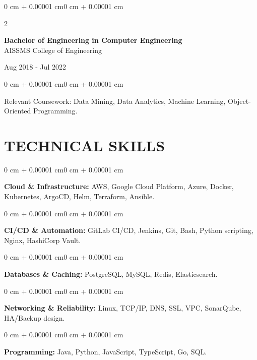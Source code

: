 \documentclass[10pt, letterpaper]{article}
\newenvironment{onecolentry}{
    \begin{adjustwidth}{0 cm + 0.00001 cm}{0 cm + 0.00001 cm}
}{
    \end{adjustwidth}
}
\newenvironment{twocolentry}[2][]{
    \onecolentry
    \def\secondColumn{#2}
    \setcolumnwidth{\fill, 4.5 cm}
    \begin{paracol}{2}
}{
    \switchcolumn \raggedleft \secondColumn
    \end{paracol}
    \endonecolentry
}
\begin{document}
\begin{twocolentry}{
    Aug 2018 - Jul 2022
}
    \textbf{Bachelor of Engineering in Computer Engineering} \\
    AISSMS College of Engineering
\end{twocolentry}
\begin{onecolentry}
Relevant Coursework: Data Mining, Data Analytics, Machine Learning, Object-Oriented Programming.
\end{onecolentry}
\section{TECHNICAL SKILLS}
\begin{onecolentry}
\textbf{Cloud \& Infrastructure:} AWS, Google Cloud Platform, Azure, Docker, Kubernetes, ArgoCD, Helm, Terraform, Ansible.
\end{onecolentry}
\vspace{0.06 cm}
\begin{onecolentry}
\textbf{CI/CD \& Automation:} GitLab CI/CD, Jenkins, Git, Bash, Python scripting, Nginx, HashiCorp Vault.
\end{onecolentry}
\vspace{0.06 cm}
\begin{onecolentry}
\textbf{Databases \& Caching:} PostgreSQL, MySQL, Redis, Elasticsearch.
\end{onecolentry}
\vspace{0.06 cm}
\begin{onecolentry}
\textbf{Networking \& Reliability:} Linux, TCP/IP, DNS, SSL, VPC, SonarQube, HA/Backup design.
\end{onecolentry}
\vspace{0.06 cm}
\begin{onecolentry}
\textbf{Programming:} Java, Python, JavaScript, TypeScript, Go, SQL.
\end{onecolentry}

\end{document}

